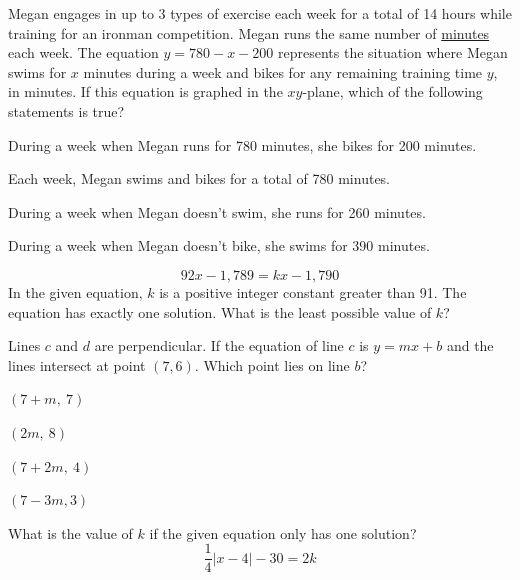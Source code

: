 \vfill
\noindent\begin{minipage}{\linewidth}
\par\smallskip
Megan engages in up to 3 types of exercise each week for a total of 14 hours while training for an ironman competition. Megan runs the same number of \underline{minutes} each week. The equation $y=780-x-200$ represents the situation where Megan swims for $x$ minutes during a week and bikes for any remaining training time $y$, in minutes. If this equation is graphed in the $xy$-plane, which of the following statements is true?
\begin{satchoices}
  \item[A)] During a week when Megan runs for 780 minutes, she bikes for 200 minutes.
  \item[B)] Each week, Megan swims and bikes for a total of 780 minutes.
  \item[C)] During a week when Megan doesn't swim, she runs for 260 minutes.
  \item[D)] During a week when Megan doesn't bike, she swims for 390 minutes.
\end{satchoices}
\end{minipage}
\vfill
\clearpage
\noindent\begin{minipage}{\linewidth}
\par\smallskip
$$92x-1{,}789=kx-1{,}790$$ In the given equation, $k$ is a positive integer constant greater than 91. The equation has exactly one solution. What is the least possible value of $k$?
\end{minipage}
\vfill
\noindent\begin{minipage}{\linewidth}
\par\smallskip
Lines $c$ and $d$ are perpendicular. If the equation of line $c$ is $y=mx+b$ and the lines intersect at point $(7,6)$. Which point lies on line $b$?
\begin{satchoices}
  \item[A)] $(7+m,\ 7)$
  \item[B)] $(2m,\ 8)$
  \item[C)] $(7+2m,\ 4)$
  \item[D)] $(7-3m,3)$
\end{satchoices}
\end{minipage}
\vfill
\noindent\begin{minipage}{\linewidth}
\par\smallskip
What is the value of $k$ if the given equation only has one solution? $$\frac{1}{4}|x-4|-30=2k$$
\end{minipage}
